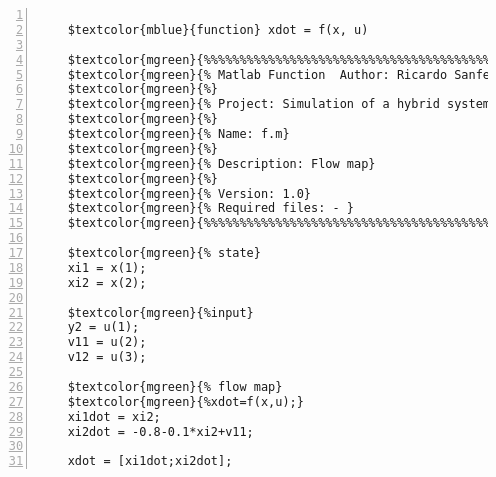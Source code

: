 %  
%  
%  
%  
  
  
\DefineShortVerb[fontfamily=courier,fontseries=m]{\$} 
\DefineShortVerb[fontfamily=courier,fontseries=b]{\#} 
  
\begin{Verbatim}[commandchars=\$\{\},numbers=left,numbersep=2pt] 

    $textcolor{mblue}{function} xdot = f(x, u) 
     
    $textcolor{mgreen}{%%%%%%%%%%%%%%%%%%%%%%%%%%%%%%%%%%%%%%%%%%%%%%%%%%%%%%%%%%%%%%%%%%%%%%%%%%%} 
    $textcolor{mgreen}{% Matlab Function  Author: Ricardo Sanfelice} 
    $textcolor{mgreen}{%} 
    $textcolor{mgreen}{% Project: Simulation of a hybrid system (interconnection)} 
    $textcolor{mgreen}{%} 
    $textcolor{mgreen}{% Name: f.m} 
    $textcolor{mgreen}{%} 
    $textcolor{mgreen}{% Description: Flow map} 
    $textcolor{mgreen}{%} 
    $textcolor{mgreen}{% Version: 1.0} 
    $textcolor{mgreen}{% Required files: - } 
    $textcolor{mgreen}{%%%%%%%%%%%%%%%%%%%%%%%%%%%%%%%%%%%%%%%%%%%%%%%%%%%%%%%%%%%%%%%%%%%%%%%%%%%} 
     
    $textcolor{mgreen}{% state} 
    xi1 = x(1); 
    xi2 = x(2); 
     
    $textcolor{mgreen}{%input} 
    y2 = u(1); 
    v11 = u(2); 
    v12 = u(3); 
     
    $textcolor{mgreen}{% flow map} 
    $textcolor{mgreen}{%xdot=f(x,u);} 
    xi1dot = xi2; 
    xi2dot = -0.8-0.1*xi2+v11; 
     
    xdot = [xi1dot;xi2dot];  
\end{Verbatim}  
  
\UndefineShortVerb{\$} 
\UndefineShortVerb{\#} 
 